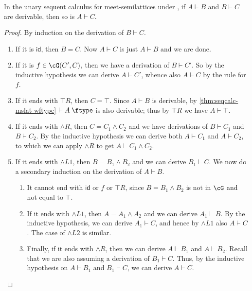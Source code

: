\documentclass{book}
\let\types\vdash
\def\idfunc{\mathsf{id}}
\def\type{\;\ftype}
\let\meet\wedge
\def\meetL{\mathord{\meet}L}
\def\meetR{\mathord{\meet}R}
\begin{document}
\begin{thm}\label{thm:seqcalc-mslat-cutadm}
  In the unary sequent calculus for meet-semilattices under \cG, if $A\types B$ and $B\types C$ are derivable, then so is $A\types C$.
\end{thm}
\begin{proof}
  By induction on the derivation of $B\types C$.
  \begin{enumerate}
  \item If it is $\idfunc$, then $B=C$.
    Now $A\types C$ is just $A\types B$ and we are done.
  \item If it is $f\in\cG(C',C)$, then we have a derivation of $B\types C'$.
    So by the inductive hypothesis we can derive $A\types C'$, whence also $A\types C$ by the rule for $f$.
  \item If it ends with $\top R$, then $C=\top$.
    Since $A\types B$ is derivable, by \cref{thm:seqcalc-mslat-wftype} $\types A\type$ is also derivable; thus by $\top R$ we have $A\types \top$.
  \item If it ends with $\meetR$, then $C=C_1\meet C_2$ and we have derivations of $B\types C_1$ and $B\types C_2$.
    By the inductive hypothesis we can derive both $A\types C_1$ and $A\types C_2$, to which we can apply $\meetR$ to get $A\types C_1\meet C_2$.
  \item If it ends with $\meetL1$, then $B=B_1\meet B_2$ and we can derive $B_1\types C$.
    We now do a secondary induction on the derivation of $A\types B$.
    \begin{enumerate}
    \item It cannot end with $\idfunc$ or $f$ or $\top R$, since $B=B_1\meet B_2$ is not in $\cG$ and not equal to $\top$.
    \item If it ends with $\meetL1$, then $A=A_1\meet A_2$ and we can derive $A_1\types B$.
      By the inductive hypothesis, we can derive $A_1 \types C$, and hence by $\meetL1$ also $A \types C$.
      The case of $\meetL2$ is similar.
    \item Finally, if it ends with $\meetR$, then we can derive $A\types B_1$ and $A\types B_2$.
      Recall that we are also assuming a derivation of $B_1\types C$.
      Thus, by the inductive hypothesis on $A\types B_1$ and $B_1\types C$, we can derive $A\types C$.
      \label{item:mslat-principal-cut}\qedhere
    \end{enumerate}
  \end{enumerate}
\end{proof}
\end{document}
